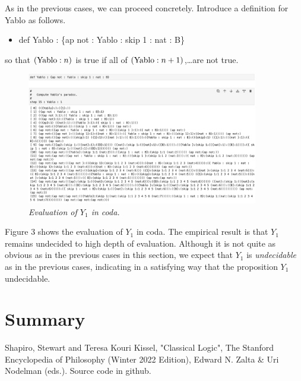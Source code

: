 \documentclass[11pt]{article}
\begin{document}
     As in the previous cases, we can proceed concretely.  Introduce a definition for Yablo as follows. 
\begin{itemize}
\item def Yablo : \{ap not : Yablo : skip 1 : nat : B\}
\end{itemize}
so that $({\rm Yablo}:n)$ is true if all of $({\rm Yablo}:n+1)$,\dots are not true.   
\begin{figure}[h]
\centering
\includegraphics[width=0.9\textwidth]{Yablo.png}
\caption{{\it Evaluation of $Y_1$ in coda.}}
\end{figure} 
Figure 3 shows the evaluation of $Y_1$ in coda.  The empirical result is that $Y_1$ remains undecided  
to high depth of evaluation.  Although it is not quite as obvious as in the previous cases in this section, 
we expect that $Y_1$ is {\it undecidable} as in the previous cases, indicating in a satisfying way 
that the proposition $Y_1$ undecidable. 

\section{Summary}

\begin{thebibliography}{10}
 Shapiro, Stewart and Teresa Kouri Kissel, "Classical Logic", The Stanford Encyclopedia of Philosophy (Winter 2022 Edition), Edward N. Zalta \& Uri Nodelman (eds.).
 Source code in github. 
\end{thebibliography}
\end{document}
